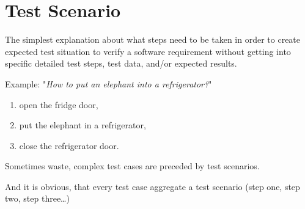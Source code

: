 \section{Test Scenario}
\label{sec:Test Scenario}

The simplest explanation about what steps need to be taken in order to create expected test situation to verify a software requirement without getting into specific detailed test steps, test data, and/or expected results.

Example: "\textit{How to put an elephant into a refrigerator?}" 

    \begin{enumerate}
\item open the fridge door,
\item put the elephant in a refrigerator, 
\item close the refrigerator door.
\end{enumerate}

Sometimes waste, complex test cases are preceded by test scenarios.

And it is obvious, that every test case aggregate a test scenario (step one, step two, step three\ldots)
